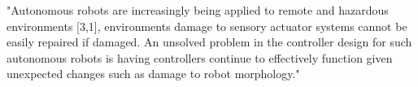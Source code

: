 

"Autonomous robots are increasingly being applied to remote and hazardous environments [3,1], environments damage to sensory actuator systems cannot be easily repaired if damaged. An unsolved problem in the controller design for such autonomous robots is having controllers continue to effectively function given unexpected changes such as damage to robot morphology."

